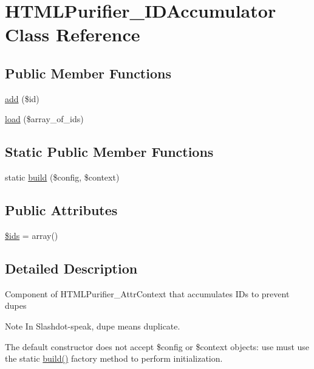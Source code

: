 \hypertarget{classHTMLPurifier__IDAccumulator}{\section{H\+T\+M\+L\+Purifier\+\_\+\+I\+D\+Accumulator Class Reference}
\label{classHTMLPurifier__IDAccumulator}
}
\subsection*{Public Member Functions}
\begin{DoxyCompactItemize}
\item 
\hyperlink{classHTMLPurifier__IDAccumulator_ac7056e917c5896f2e8fff2dfc22e396e}{add} (\$id)
\item 
\hyperlink{classHTMLPurifier__IDAccumulator_aa669d74e219c528ae241f114654e1fd5}{load} (\$array\+\_\+of\+\_\+ids)
\end{DoxyCompactItemize}
\subsection*{Static Public Member Functions}
\begin{DoxyCompactItemize}
\item 
static \hyperlink{classHTMLPurifier__IDAccumulator_a187720677bc154b2039ae7a3d1dc7967}{build} (\$config, \$context)
\end{DoxyCompactItemize}
\subsection*{Public Attributes}
\begin{DoxyCompactItemize}
\item 
\hyperlink{classHTMLPurifier__IDAccumulator_a8b1925aa347f0da5360b5daff2915f31}{\$ids} = array()
\end{DoxyCompactItemize}


\subsection{Detailed Description}
Component of H\+T\+M\+L\+Purifier\+\_\+\+Attr\+Context that accumulates I\+Ds to prevent dupes \begin{DoxyNote}{Note}
In Slashdot-\/speak, dupe means duplicate. 

The default constructor does not accept \$config or \$context objects\+: use must use the static \hyperlink{classHTMLPurifier__IDAccumulator_a187720677bc154b2039ae7a3d1dc7967}{build()} factory method to perform initialization. 
\end{DoxyNote}



